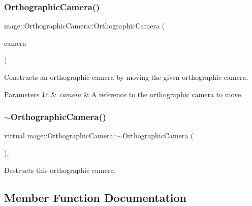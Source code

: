 \subsubsection{\texorpdfstring{Orthographic\+Camera()}{OrthographicCamera()}\hspace{0.1cm}{\footnotesize\ttfamily [3/3]}}
{\footnotesize\ttfamily mage\+::\+Orthographic\+Camera\+::\+Orthographic\+Camera (\begin{DoxyParamCaption}\item[{\hyperlink{classmage_1_1_orthographic_camera}{Orthographic\+Camera} \&\&}]{camera }\end{DoxyParamCaption})\hspace{0.3cm}{\ttfamily [default]}}

Constructs an orthographic camera by moving the given orthographic camera.


\begin{DoxyParams}[1]{Parameters}
\mbox{\tt in}  & {\em camera} & A reference to the orthographic camera to move. \\
\hline
\end{DoxyParams}
\hypertarget{classmage_1_1_orthographic_camera_abdad923634e17f217ba975a9149f6c57}{}\label{classmage_1_1_orthographic_camera_abdad923634e17f217ba975a9149f6c57} 
\subsubsection{\texorpdfstring{$\sim$\+Orthographic\+Camera()}{~OrthographicCamera()}}
{\footnotesize\ttfamily virtual mage\+::\+Orthographic\+Camera\+::$\sim$\+Orthographic\+Camera (\begin{DoxyParamCaption}{ }\end{DoxyParamCaption})\hspace{0.3cm}{\ttfamily [virtual]}, {\ttfamily [default]}}

Destructs this orthographic camera. 

\subsection{Member Function Documentation}
\hypertarget{classmage_1_1_orthographic_camera_a4b9e8cca5814d955efe1dad1df784aba}{}\label{classmage_1_1_orthographic_camera_a4b9e8cca5814d955efe1dad1df784aba} 
